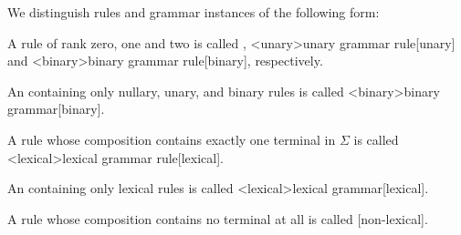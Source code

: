\documentclass[../../document.tex]{subfiles}
\begin{document}
    \begin{definition}
        We distinguish rules and grammar instances of the following form:
        \begin{compactitem}
            \item A rule of rank zero, one and two is called , <unary>{unary grammar rule}[unary] and <binary>{binary grammar rule}[binary], respectively.
            \item An  containing only nullary, unary, and binary rules is called <binary>{binary grammar}[binary].
            \item A rule whose composition contains exactly one terminal in \(\varSigma\) is called <lexical>{lexical grammar rule}[lexical].
            \item An  containing only lexical rules is called <lexical>{lexical grammar}[lexical].
            \item A rule whose composition contains no terminal at all is called [non-lexical].
        \end{compactitem}
    \end{definition}
\end{document}
